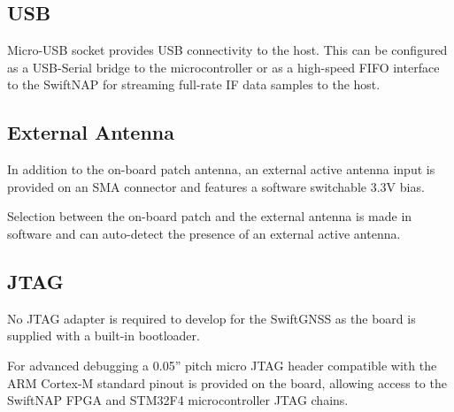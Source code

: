 \documentclass{article}
\begin{document}
\begin{multicols*}{2}
\raggedcolumns

\subsection*{USB}

Micro-USB socket provides USB connectivity to the host. This can be configured
as a USB-Serial bridge to the microcontroller or as a high-speed FIFO
interface to the SwiftNAP for streaming full-rate IF data samples to the host.

\subsection*{External Antenna}

In addition to the on-board patch antenna, an external active antenna input is
provided on an SMA connector and features a software switchable 3.3V bias.

Selection between the on-board patch and the external antenna is made in
software and can auto-detect the presence of an external active antenna.

\subsection*{JTAG}

No JTAG adapter is required to develop for the SwiftGNSS as the board is
supplied with a built-in bootloader.

For advanced debugging a 0.05'' pitch micro JTAG header compatible with the
ARM Cortex-M standard pinout is provided on the board, allowing access to the
SwiftNAP FPGA and STM32F4 microcontroller JTAG chains.

\vspace{0.5cm}
\begin{center}
\end{center}


\end{multicols*}
\end{document}
